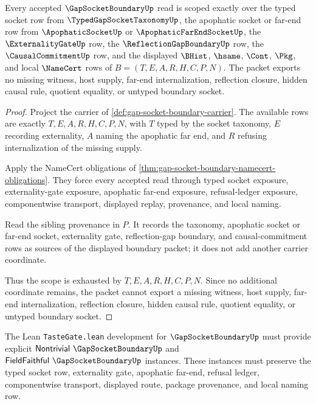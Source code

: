 \begin{theorem}
\label{thm:gap-socket-boundary-scope-exhaustion}
Every accepted $\GapSocketBoundaryUp$ read is scoped exactly over the typed socket row from $\TypedGapSocketTaxonomyUp$, the apophatic socket or far-end row from $\ApophaticSocketUp$ or $\ApophaticFarEndSocketUp$, the $\ExternalityGateUp$ row, the $\ReflectionGapBoundaryUp$ row, the $\CausalCommitmentUp$ row, and the displayed $\BHist$, $\hsame$, $\Cont$, $\Pkg$, and local $\NameCert$ rows of $B=(T,E,A,R,H,C,P,N)$. The packet exports no missing witness, host supply, far-end internalization, reflection closure, hidden causal rule, quotient equality, or untyped boundary socket.
\end{theorem}
\begin{proof}
Project the carrier of \autoref{def:gap-socket-boundary-carrier}. The available rows are exactly $T,E,A,R,H,C,P,N$, with $T$ typed by the socket taxonomy, $E$ recording externality, $A$ naming the apophatic far end, and $R$ refusing internalization of the missing supply.

Apply the NameCert obligations of \autoref{thm:gap-socket-boundary-namecert-obligations}. They force every accepted read through typed socket exposure, externality-gate exposure, apophatic far-end exposure, refusal-ledger exposure, componentwise transport, displayed replay, provenance, and local naming.

Read the sibling provenance in $P$. It records the taxonomy, apophatic socket or far-end socket, externality gate, reflection-gap boundary, and causal-commitment rows as sources of the displayed boundary packet; it does not add another carrier coordinate.

Thus the scope is exhausted by $T,E,A,R,H,C,P,N$. Since no additional coordinate remains, the packet cannot export a missing witness, host supply, far-end internalization, reflection closure, hidden causal rule, quotient equality, or untyped boundary socket.
\end{proof}

The Lean \texttt{TasteGate.lean} development for $\GapSocketBoundaryUp$ must provide explicit $\mathsf{Nontrivial}\ \GapSocketBoundaryUp$ and $\mathsf{FieldFaithful}\ \GapSocketBoundaryUp$ instances. These instances must preserve the typed socket row, externality gate, apophatic far-end, refusal ledger, componentwise transport, displayed route, package provenance, and local naming row.


